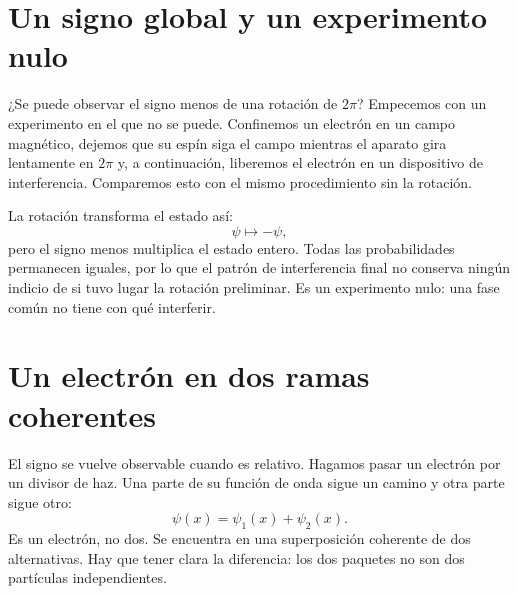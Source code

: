 \begin{classroomqa}
\end{classroomqa}

\section{Un signo global y un experimento nulo}

¿Se puede observar el signo menos de una rotación de \(2\pi\)? Empecemos con un experimento en el que no se puede. Confinemos un electrón en un campo magnético, dejemos que su espín siga el campo mientras el aparato gira lentamente en \(2\pi\) y, a continuación, liberemos el electrón en un dispositivo de interferencia. Comparemos esto con el mismo procedimiento sin la rotación.

La rotación transforma el estado así:
\begin{equation}
\psi\longmapsto-\psi,
\end{equation}
pero el signo menos multiplica el estado entero. Todas las probabilidades permanecen iguales, por lo que el patrón de interferencia final no conserva ningún indicio de si tuvo lugar la rotación preliminar. Es un experimento nulo: una fase común no tiene con qué interferir.

\begin{classroomqa}
\end{classroomqa}

\section{Un electrón en dos ramas coherentes}

El signo se vuelve observable cuando es relativo. Hagamos pasar un electrón por un divisor de haz. Una parte de su función de onda sigue un camino y otra parte sigue otro:
\begin{equation}
\psi(x)=\psi_1(x)+\psi_2(x).
\end{equation}
Es un electrón, no dos. Se encuentra en una superposición coherente de dos alternativas. Hay que tener clara la diferencia: los dos paquetes no son dos partículas independientes.

